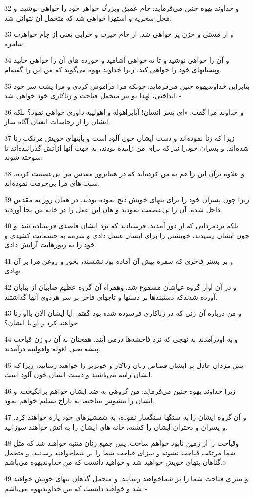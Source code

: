 \par 32 و خداوند یهوه چنین می‌فرماید: جام عمیق وبزرگ خواهر خود را خواهی نوشید. و محل سخریه و استهزا خواهی شد که متحمل آن نتوانی شد.
\par 33 و از مستی و حزن پر خواهی شد. از جام حیرت و خرابی یعنی از جام خواهرت سامره.
\par 34 و آن را خواهی نوشید و تا ته خواهی آشامید و خورده های آن را خواهی خایید وپستانهای خود را خواهی کند، زیرا خداوند یهوه می‌گوید که من این را گفته‌ام.
\par 35 بنابراین خداوندیهوه چنین می‌فرماید: چونکه مرا فراموش کردی و مرا پشت سر خود انداختی، لهذا تو نیز متحمل قباحت و زناکاری خود خواهی شد.»
\par 36 و خداوند مرا گفت: «ای پسر انسان! آیابراهوله و اهولیبه داوری خواهی نمود؟ بلکه ایشان را از رجاسات ایشان آگاه ساز.
\par 37 زیرا که زنا نموده‌اند و دست ایشان خون آلود است و بابتهای خویش مرتکب زنا شده‌اند. و پسران خودرا نیز که برای من زاییده بودند، به جهت آنها ازآتش گذرانیده‌اند تا سوخته شوند.
\par 38 و علاوه برآن این را هم به من کرده‌اند که در همانروز مقدس مرا بی‌عصمت کرده، سبت های مرا بی‌حرمت نموده‌اند.
\par 39 زیرا چون پسران خود را برای بتهای خویش ذبح نموده بودند، در همان روز به مقدس داخل شده، آن را بی‌عصمت نمودند و هان این عمل را در خانه من بجا آوردند.
\par 40 بلکه نزدمردانی که از دور آمدند، فرستادید که نزد ایشان قاصدی فرستاده شد. و چون ایشان رسیدند، خویشتن را برای ایشان غسل دادی و سرمه به چشمانت کشیدی و خود را به زیورهایت آرایش دادی.
\par 41 و بر بستر فاخری که سفره پیش آن آماده بود نشسته، بخور و روغن مرا بر آن نهادی.
\par 42 و در آن آواز گروه عیاشان مسموع شد. وهمراه آن گروه عظیم صابیان از بیابان آورده شدندکه دستبندها بر دستها و تاجهای فاخر بر سر هردوی آنها گذاشتند.
\par 43 و من درباره آن زنی که در زناکاری فرسوده شده بود گفتم: آیا ایشان الان بااو زنا خواهند کرد و او با ایشان؟
\par 44 و به اودرآمدند به نهجی که نزد فاحشه‌ها درمی آیند. همچنان به آن دو زن قباحت پیشه یعنی اهوله واهولیبه درآمدند.
\par 45 پس مردان عادل بر ایشان قصاص زنان زناکار و خونریز را خواهند رسانید، زیرا که ایشان زانیه می‌باشند و دست ایشان خون آلود است.
\par 46 زیرا خداوند یهوه چنین می‌فرماید: من گروهی به ضد ایشان خواهم برانگیخت. و ایشان را مشوش ساخته، به تاراج تسلیم خواهم نمود.
\par 47 و آن گروه ایشان را به سنگها سنگسار نموده، به شمشیرهای خود پاره خواهند کرد. و پسران و دختران ایشان را کشته، خانه های ایشان را به آتش خواهند سوزانید.
\par 48 وقباحت را از زمین نابود خواهم ساخت. پس جمیع زنان متنبه خواهند شد که مثل شما مرتکب قباحت نشوند.و سزای قباحت شما را بر شماخواهند رسانید. و متحمل گناهان بتهای خویش خواهید شد و خواهید دانست که من خداوندیهوه می‌باشم.»
\par 49 و سزای قباحت شما را بر شماخواهند رسانید. و متحمل گناهان بتهای خویش خواهید شد و خواهید دانست که من خداوندیهوه می‌باشم.»

